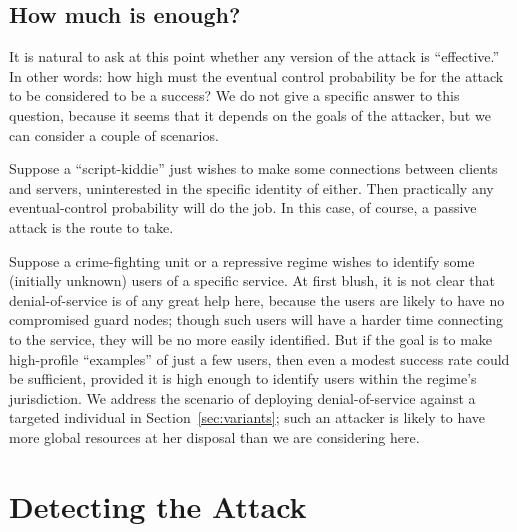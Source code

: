 \documentclass[]{lmcs}
\begin{document}
\subsection{How much is enough?}

It is natural to ask at this point whether any version of the attack
is ``effective.''  In other words:  how high must the eventual control
probability be for the attack to be considered to be a success?  We
do not give a specific answer to this question, because
it seems that it depends on the goals of the attacker, but we can
consider a couple of scenarios.

Suppose a ``script-kiddie'' just wishes to make some connections between
clients and servers, uninterested in the specific identity of either.
Then practically any eventual-control probability will do the job.  In
this case, of course, a passive attack is the route to take.

Suppose a crime-fighting unit or a repressive regime wishes to identify
some (initially unknown) users of a specific service.  At first blush,
it is not clear that denial-of-service is of any great help here,
because the users are likely to have no compromised guard nodes;
though such users will have a harder time connecting to the service,
they will be no more easily identified.  But if the goal is to make
high-profile ``examples'' of just a few users, then even a modest success
rate could be sufficient, provided it is high enough to identify users
within the regime's jurisdiction.
We address the scenario of deploying denial-of-service against a
targeted individual in Section~\ref{sec:variants}; such an attacker
is likely to have more global resources at her disposal than we are
considering here.

\section{Detecting the Attack}
\label{sec:detection-alg}
\end{document}

